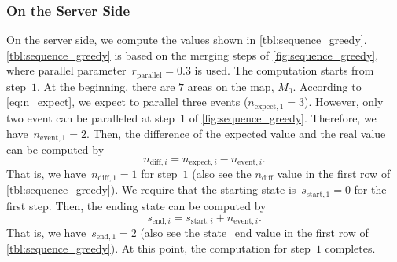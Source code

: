 \documentclass[ijgi,article,submit,moreauthors,pdftex]{Definitions/mdpi}
\begin{document}
\subsubsection{On the Server Side}
\label{sec:snap_server}

On the server side, we compute the values shown in \tbl\ref{tbl:sequence_greedy}.
\tbl\ref{tbl:sequence_greedy} is based on the merging steps of
\fig\ref{fig:sequence_greedy},
where parallel parameter~$r_\mathrm{parallel} = 0.3$ is used.
The computation starts from step~$1$.
At the beginning, there are $7$ areas on the map, \ie$M_0$.
According to \eq\ref{eq:n_expect},
we expect to parallel three events ($n_{\mathrm{expect},1} = 3$).
However, only two event can be paralleled at step~$1$ of
\fig\ref{fig:sequence_greedy}.
Therefore, we have~$n_{\mathrm{event},1} = 2$.
Then, the difference of the expected value and the real value
can be computed by
\begin{equation}
\label{eq:n_diff}
n_{\mathrm{diff},i} = n_{\mathrm{expect},i} - n_{\mathrm{event},i}.
\end{equation}
That is, we have~$n_{\mathrm{diff},1}=1$ for step~$1$
(also see the $n_\mathrm{diff}$ value in the first row of \tbl\ref{tbl:sequence_greedy}).
We require that the starting state is~$s_{\mathrm{start},1} = 0$ for the first step.
Then, the ending state can be computed by
\begin{equation}
\label{eq:state_end}
s_{\mathrm{end},i} = s_{\mathrm{start},i} + n_{\mathrm{event},i}.
\end{equation}
That is, we have~$s_{\mathrm{end},1}=2$
(also see the state\_end value in the first row of \tbl\ref{tbl:sequence_greedy}).
At this point, the computation for step~$1$ completes.
\end{document}
